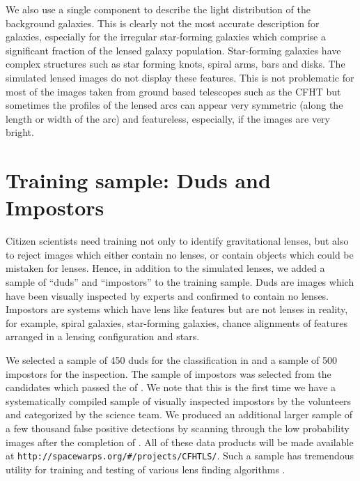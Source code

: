 \documentclass[useAMS,usenatbib,a4paper]{mn2e}
\begin{document}
We also use a single component to describe the light distribution of the
background galaxies. This is clearly not the most accurate description
for galaxies, especially for the irregular star-forming galaxies which
comprise a significant fraction of the lensed galaxy population.
Star-forming galaxies have complex structures such as star forming
knots, spiral arms, bars and disks. The simulated lensed images do not
display these features. This is not problematic for most of the images
taken from ground based telescopes such as the CFHT but sometimes the
profiles of the lensed arcs can appear very symmetric (along the length
or width of the arc) and featureless, especially, if the images are very
bright.


\section{Training sample: Duds and Impostors}
\label{sec:dfp}

Citizen scientists need training not only to identify gravitational
lenses, but also to reject images which either contain no lenses, or contain
objects which could be mistaken for lenses. Hence, in addition to the simulated
lenses, we added a sample of ``duds'' and ``impostors'' to the training
sample. Duds are images which have been visually inspected by experts
and confirmed to contain no lenses. Impostors are systems
which have lens like features but are not lenses in reality, for example, spiral galaxies,
star-forming galaxies, chance alignments of features arranged in a
lensing configuration and stars.

We selected a sample of 450 duds for the \StageOne classification in \sw
and a sample of 500 impostors for the \StageTwo inspection. The
sample of impostors was selected from the candidates which passed
the \StageOne of \sw. We note that this is the first time we have a
systematically compiled sample of visually inspected impostors by
the \sw volunteers and categorized by the science team. We produced an
additional larger sample of a few thousand false positive detections
by scanning through the
low probability images after the completion of \StageTwo. All of these
data products will be made available at
\texttt{http://spacewarps.org/\#/projects/CFHTLS/}. Such a sample has tremendous
utility for training and testing of various lens finding algorithms
\citep[e.g.,][]{Chan2014}.
\end{document}
